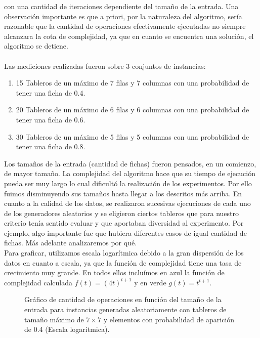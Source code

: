 \documentclass[10pt, a4paper,english,spanish]{article}
\begin{document}
con una cantidad de iteraciones dependiente del tamaño de la entrada. Una observación importante es que a priori, por la naturaleza del algoritmo,
sería razonable que la cantidad de operaciones efectivamente ejecutadas no siempre alcanzara la cota de complejidad, ya que en cuanto
se encuentra una solución, el algoritmo se detiene.
\\\\
\indent Las mediciones realizadas fueron sobre 3 conjuntos de instancias:
\begin{enumerate}
 \item 15 Tableros de un máximo de 7 filas y 7 columnas con una probabilidad de tener una ficha de 0.4. 
\item 20 Tableros de un máximo de 6 filas y 6 columnas con una probabilidad de tener una ficha de 0.6. 
\item 30 Tableros de un máximo de 5 filas y 5 columnas con una probabilidad de tener una ficha de 0.8. 
\end{enumerate}

Los tamaños de la entrada (cantidad de fichas) fueron pensados, en un comienzo, de mayor tamaño. La complejidad del algoritmo hace que su tiempo
de ejecución pueda ser muy largo lo cual dificultó la realización de los experimentos. Por ello fuimos disminuyendo sus tamaños
hasta llegar a los descritos más arriba. En cuanto a la calidad de los datos, se realizaron sucesivas ejecuciones de cada uno de
los generadores aleatorios y se eligieron ciertos tableros que para nuestro criterio tenía sentido evaluar y que aportaban diversidad
al experimento. Por ejemplo, algo importante fue que hubiera diferentes casos de igual cantidad de fichas. Más adelante analizaremos por qué. \\

Para graficar, utilizamos escala logarítmica debido a la gran dispersión de los datos en cuanto a escala, ya que la función
de complejidad tiene una tasa de crecimiento muy grande. En todos ellos incluímos en azul la función de complejidad calculada 
$f(t) = (4t)^{t+1}$ y en verde $g(t) = t^{t+1}$.

\begin{figure}[H]
	 \begin{center}
	   \caption{Gráfico de cantidad de operaciones en función del tamaño de la entrada para instancias generadas 
	   aleatoriamente con tableros de tamaño máximo de $7\times 7$ y elementos con probabilidad de aparición de 0.4
	  (Escala logarítmica).} 
	   \label{gr5}
	 \end{center}
\end{figure}
\end{document}
